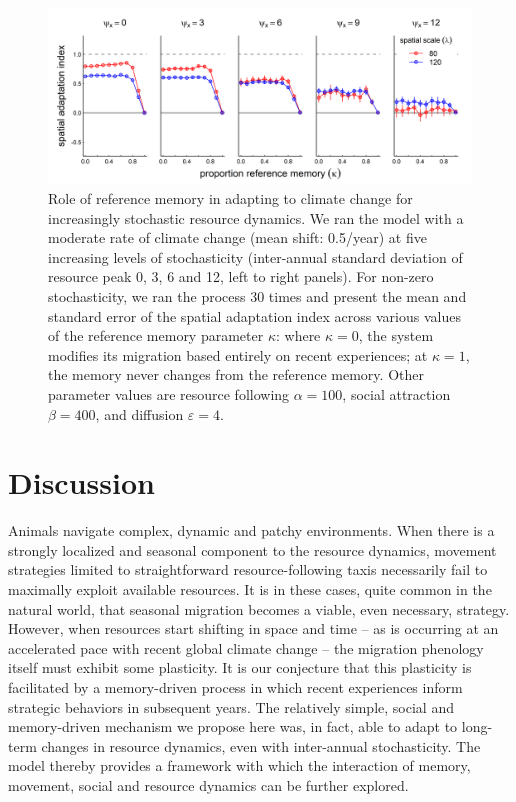 \documentclass[utf8]{frontiersSCNS} %
\begin{document}
	\begin{figure}
		
		\includegraphics[width=\textwidth]{figures/TrendStochasticity.png}
		
		\caption{ \label{fig_trendstochasticity} Role of reference memory in adapting to climate change for increasingly stochastic resource dynamics. We ran the model with a moderate rate of climate change (mean shift: 0.5/year) at five increasing levels of stochasticity (inter-annual standard deviation of resource peak 0, 3, 6 and 12, left to right panels). For non-zero stochasticity, we ran the process 30 times and present the mean and standard error of the spatial adaptation index across various values of the reference memory parameter $\kappa$: where $\kappa = 0$, the system modifies its migration based entirely on recent experiences; at $\kappa = 1$, the memory never changes from the reference memory. Other parameter values are resource following $\alpha = 100$, social attraction $\beta = 400$, and diffusion $\varepsilon = 4$.}
		
	\end{figure}
	
\section{Discussion}
	
	Animals navigate complex, dynamic and patchy environments. When there is a strongly localized and seasonal component to the resource dynamics, movement strategies limited to straightforward resource-following taxis necessarily fail to maximally exploit available resources. It is in these cases, quite common in the natural world, that seasonal migration becomes a viable, even necessary, strategy.  However, when resources start shifting in space and time -- as is occurring at an accelerated pace with recent global climate change -- the migration phenology itself must exhibit some plasticity. It is our conjecture that this plasticity is facilitated by a memory-driven process in which recent experiences inform strategic behaviors in subsequent years. The relatively simple, social and memory-driven mechanism we propose here was, in fact, able to adapt to long-term changes in resource dynamics, even with inter-annual stochasticity. The model thereby provides a framework with which the interaction  of memory, movement, social and resource dynamics can be further explored.	
		
\end{document}

